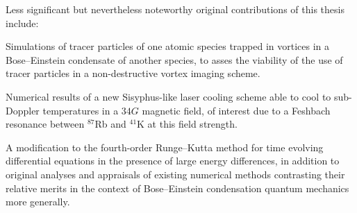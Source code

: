 Less significant but nevertheless noteworthy original contributions of this thesis include:

Simulations of tracer particles of one atomic species trapped in vortices in a Bose--Einstein condensate of another species, to asses the viability of the use of tracer particles in a non-destructive vortex imaging scheme. 

Numerical results of a new Sisyphus-like laser cooling scheme able to cool to sub-Doppler temperatures in a $34\unit{G}$ magnetic field, of interest due to a Feshbach resonance between $^{87}$Rb and $^{41}$K at this field strength.

A modification to the fourth-order Runge--Kutta method for time evolving differential equations in the presence of large energy differences, in addition to original analyses and appraisals of existing numerical methods contrasting their relative merits in the context of Bose--Einstein condensation quantum mechanics more generally.
